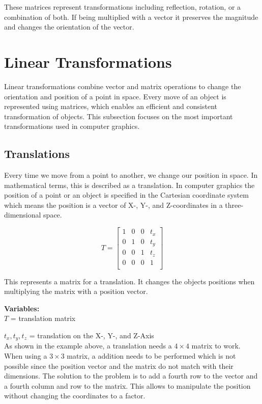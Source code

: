 These matrices represent transformations including reflection, rotation, or a combination of both. If being multiplied with a vector it preserves the magnitude and changes the orientation of the vector.\ \cite{Web:22}



\section{Linear Transformations}
Linear transformations combine vector and matrix operations to change the orientation and position of a point in space. Every move of an object is represented using matrices, which enables an efficient and consistent transformation of objects. This subsection focuses on the most important transformations used in computer graphics.

\subsection{Translations}
Every time we move from a point to another, we change our position in space. In mathematical terms, this is described as a translation. In computer graphics the position of a point or an object is specified in the Cartesian coordinate system which means the position is a vector of X-, Y-, and Z-coordinates in a three-dimensional space.

\[
T = 
\begin{bmatrix}
1 & 0 & 0 & t_x \\
0 & 1 & 0 & t_y \\
0 & 0 & 1 & t_z \\
0 & 0 & 0 & 1 \\
\end{bmatrix}
\]
\noindent\cite{Web:36}

This represents a matrix for a translation. It changes the objects positions when multiplying the matrix with a position vector.

\textbf{Variables: } \\
$T$ = translation matrix

$t_x, t_y, t_z$ = translation on the X-, Y-, and Z-Axis \\

As shown in the example above, a translation needs a $4 \times 4$ matrix to work. When using a $3 \times 3$ matrix, a addition needs to be performed which is not possible since the position vector and the matrix do not match with their dimensions. The solution to the problem is to add a fourth row to the vector and a fourth column and row to the matrix. This allows to manipulate the position without changing the coordinates to a factor.\ \cite{Web:36}

